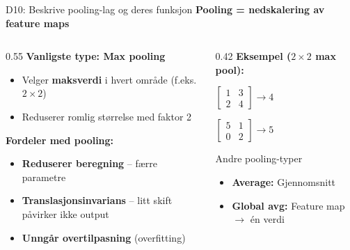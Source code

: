 \documentclass[aspectratio=169, 10pt]{beamer}
\begin{document}
\begin{frame}{D10: Beskrive pooling-lag og deres funksjon}
    \textbf{Pooling = nedskalering av feature maps}

    \vspace{0.2cm}
    \begin{columns}[T]
        \begin{column}{0.55\textwidth}
            \textbf{Vanligste type: Max pooling}
            \begin{itemize}
                \item Velger \textbf{maksverdi} i hvert område (f.eks. $2 \times 2$)
                \item Reduserer romlig størrelse med faktor 2
            \end{itemize}

            \vspace{0.2cm}
            \textbf{Fordeler med pooling:}
            \begin{itemize}
                \item \textbf{Reduserer beregning} -- færre parametre
                \item \textbf{Translasjonsinvarians} -- litt skift påvirker ikke output
                \item \textbf{Unngår overtilpasning} (overfitting)
            \end{itemize}
        \end{column}
        \begin{column}{0.42\textwidth}
            \textbf{Eksempel ($2 \times 2$ max pool):}
            \begin{center}
                $\begin{bmatrix} 1 & 3 \\ 2 & 4 \end{bmatrix} \rightarrow 4$

                \vspace{0.2cm}
                $\begin{bmatrix} 5 & 1 \\ 0 & 2 \end{bmatrix} \rightarrow 5$
            \end{center}

            \vspace{0.2cm}
            \begin{block}{\footnotesize Andre pooling-typer}
                \footnotesize
                \begin{itemize}
                    \item \textbf{Average:} Gjennomsnitt
                    \item \textbf{Global avg:} Feature map $\rightarrow$ én verdi
                \end{itemize}
            \end{block}
        \end{column}
    \end{columns}
\end{frame}
\end{document}
